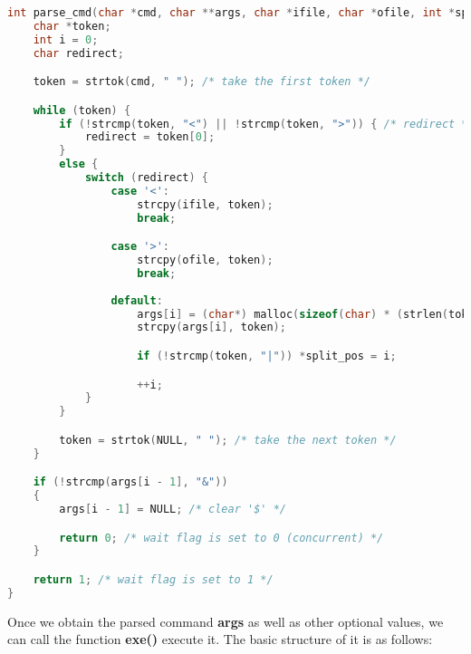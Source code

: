 \documentclass{article}
\begin{document}
\begin{lstlisting}[language=c ,caption={parse\_cmd()},captionpos=b]
int parse_cmd(char *cmd, char **args, char *ifile, char *ofile, int *split_pos) {
    char *token;
    int i = 0;
    char redirect;

    token = strtok(cmd, " "); /* take the first token */

    while (token) {
        if (!strcmp(token, "<") || !strcmp(token, ">")) { /* redirect */
            redirect = token[0];
        }
        else {
            switch (redirect) {
                case '<':
                    strcpy(ifile, token);
                    break;

                case '>':
                    strcpy(ofile, token);
                    break;
                
                default:
                    args[i] = (char*) malloc(sizeof(char) * (strlen(token)));
                    strcpy(args[i], token);

                    if (!strcmp(token, "|")) *split_pos = i;

                    ++i;
            }
        }

        token = strtok(NULL, " "); /* take the next token */
    }

    if (!strcmp(args[i - 1], "&")) 
    {
        args[i - 1] = NULL; /* clear '$' */

        return 0; /* wait flag is set to 0 (concurrent) */
    }

    return 1; /* wait flag is set to 1 */
}
\end{lstlisting}

Once we obtain the parsed command \textbf{args} as well as other optional values, we can call the function \textbf{exe()} execute it. The basic structure of it is as follows:
\end{document}
